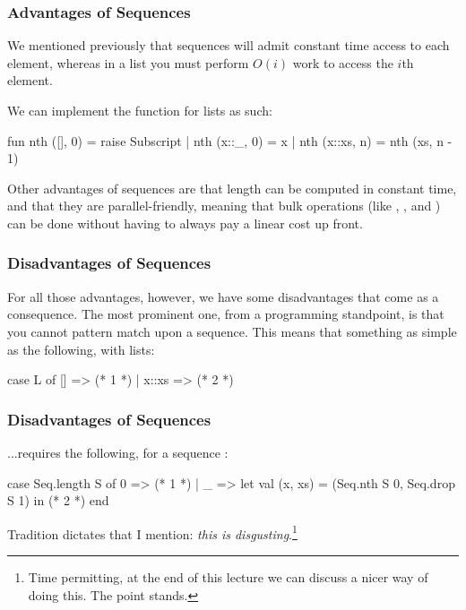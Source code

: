 \documentclass[aspectratio=169, handout]{beamer}
\begin{document}
\begin{frame}[fragile]
  \frametitle{Advantages of Sequences}

  We mentioned previously that sequences will admit constant time access to
  each element, whereas in a list you must perform $O(i)$ work to access the
  $i$th element.

  \pause
  \vspace{\fill}

  We can implement the  function for lists as such:

  \begin{codeblock}
    fun nth ([], 0)   = raise Subscript
      | nth (x::_, 0) = x
      | nth (x::xs, n) = nth (xs, n - 1)
  \end{codeblock}

  \pause
  \vspace{\fill}

  Other advantages of sequences are that length can be computed in constant time,
  and that they are parallel-friendly, meaning that bulk operations (like
  , , and ) can be done
  without having to always pay a linear cost up front.
\end{frame}

\begin{frame}[fragile]
  \frametitle{Disadvantages of Sequences}

  For all those advantages, however, we have some disadvantages that come as a
  consequence. The most prominent one, from a programming standpoint, is that
  you cannot pattern match upon a sequence. This means that something as simple
  as the following, with lists:

  \begin{codeblock}
    case L of
      []    => (* 1 *)
    | x::xs => (* 2 *)
  \end{codeblock}
\end{frame}

\begin{frame}[fragile]
  \frametitle{Disadvantages of Sequences}

  ...requires the following, for a sequence :
  \begin{codeblock}
    case Seq.length S of
      0 => (* 1 *)
    | _ =>
      let
        val (x, xs) = (Seq.nth S 0, Seq.drop S 1)
      in
        (* 2 *)
      end
  \end{codeblock}

  \pause
  \vspace{\fill}

  Tradition dictates that I mention: \textit{this is disgusting}.\footnote{Time
  permitting, at the end of this lecture we can discuss a nicer way of doing
  this. The point stands.}
\end{frame}
\end{document}

